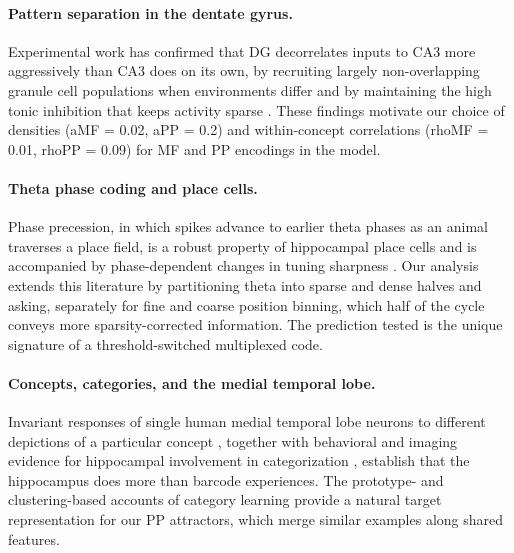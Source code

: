 \paragraph{Pattern separation in the dentate gyrus.} Experimental work has confirmed that DG decorrelates inputs to CA3 more aggressively than CA3 does on its own, by recruiting largely non-overlapping granule cell populations when environments differ \cite{leutgeb2007pattern} and by maintaining the high tonic inhibition that keeps activity sparse \cite{engin2015tonic}. These findings motivate our choice of densities (aMF = 0.02, aPP = 0.2) and within-concept correlations (rhoMF = 0.01, rhoPP = 0.09) for MF and PP encodings in the model.

\paragraph{Theta phase coding and place cells.} Phase precession, in which spikes advance to earlier theta phases as an animal traverses a place field, is a robust property of hippocampal place cells \cite{okeefe1993phase,tsodyks1996population} and is accompanied by phase-dependent changes in tuning sharpness \cite{skaggs1996theta}. Our analysis extends this literature by partitioning theta into sparse and dense halves and asking, separately for fine and coarse position binning, which half of the cycle conveys more sparsity-corrected information. The prediction tested is the unique signature of a threshold-switched multiplexed code.

\paragraph{Concepts, categories, and the medial temporal lobe.} Invariant responses of single human medial temporal lobe neurons to different depictions of a particular concept \cite{quiroga2005invariant}, together with behavioral and imaging evidence for hippocampal involvement in categorization \cite{knowlton1993learning,zeithamova2019brain}, establish that the hippocampus does more than barcode experiences. The prototype- and clustering-based accounts of category learning \cite{anderson1991adaptive,love2004sustain} provide a natural target representation for our PP attractors, which merge similar examples along shared features.

